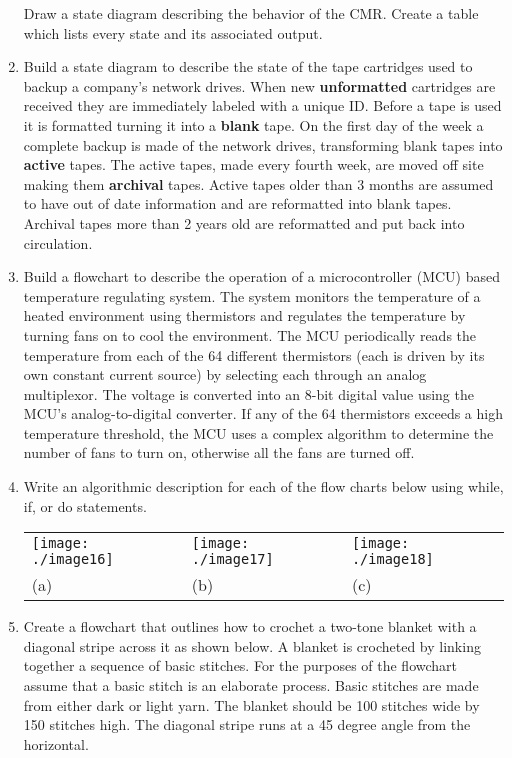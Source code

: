 \begin{enumerate}
  Draw a state diagram describing the behavior of the CMR. Create a
  table which lists every state and its associated output.

  \item
  \label{problem:stateDiagramTapeCartridges}
    Build a state diagram to describe the state of the tape cartridges
    used to backup a company's network drives. When new
    \textbf{unformatted} cartridges are received they are immediately
    labeled with a unique ID. Before a tape is used it is formatted
    turning it into a \textbf{blank} tape. On the first day of the week
    a complete backup is made of the network drives, transforming blank
    tapes into \textbf{active} tapes. The active tapes, made every
    fourth week, are moved off site making them \textbf{archival} tapes.
    Active tapes older than 3 months are assumed to have out of date
    information and are reformatted into blank tapes. Archival tapes
    more than 2 years old are reformatted and put back into circulation.
  \item
    Build a flowchart to describe the operation of a microcontroller
    (MCU) based temperature regulating system. The system monitors the
    temperature of a heated environment using thermistors and regulates
    the temperature by turning fans on to cool the environment. The MCU
    periodically reads the temperature from each of the 64 different
    thermistors (each is driven by its own constant current source) by
    selecting each through an analog multiplexor. The voltage is
    converted into an 8-bit digital value using the MCU's
    analog-to-digital converter. If any of the 64 thermistors exceeds a
    high temperature threshold, the MCU uses a complex algorithm to
    determine the number of fans to turn on, otherwise all the fans are
    turned off.
  \item
    Write an algorithmic description for each of the flow charts below
    using while, if, or do statements.

\begin{tabular}{m{4cm}m{4cm}m{4cm}}
\texttt{[image: ./image16]} &
\texttt{[image: ./image17]} &
\texttt{[image: ./image18]} \\
(a) &  (b)  & (c) \\
\end{tabular}

\item
  Create a flowchart that outlines how to crochet a two-tone blanket
  with a diagonal stripe across it as shown below. A blanket is
  crocheted by linking together a sequence of basic stitches. For the
  purposes of the flowchart assume that a basic stitch is an elaborate
  process. Basic stitches are made from either dark or light yarn. The
  blanket should be 100 stitches wide by 150 stitches high. The diagonal
  stripe runs at a 45 degree angle from the horizontal.


\end{enumerate}
